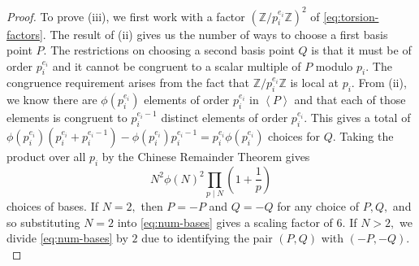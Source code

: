 \documentclass[10pt,a4paper]{amsart}
\begin{document}
\begin{proof}
  To prove (iii), we first work with a factor $(\mathbb{Z}/p_i^{e_i}\mathbb{Z})^2$ of \eqref{eq:torsion-factors}. The result of (ii) gives us the number of ways to choose a first basis point $P$. The restrictions on choosing a second basis point $Q$ is that it must be of order $p_i^{e_i}$ and it cannot be congruent to a scalar multiple of $P$ modulo $p_i.$ The congruence requirement arises from the fact that $\mathbb{Z}/p_i^{e_i} \mathbb{Z}$ is local at $p_i.$ From (ii), we know there are $\phi(p_i^{e_i})$ elements of order $p_i^{e_i}$ in $\left\langle P \right\rangle$ and that each of those elements is congruent to $p_i^{e_i-1}$ distinct elements of order $p_i^{e_i}.$ This gives a total of  $\phi(p_i^{e_i})(p_i^{e_i} + p_i^{e_i-1}) - \phi(p_i^{e_i})p_i^{e_i-1} = p_i^{e_i}\phi(p_i^{e_i})$ choices for $Q.$ Taking the product over all $p_i$ by the Chinese Remainder Theorem gives
  \begin{equation}\label{eq:num-bases}
    N^2\phi(N)^2\prod_{p \mid N}\left( 1 + \frac{1}{p} \right)
  \end{equation}
  choices of bases. If $N = 2,$ then $P = -P$ and $Q = -Q$ for any choice of $P, Q,$ and so substituting $N = 2$ into \eqref{eq:num-bases} gives a scaling factor of $6.$ If $N > 2,$ we divide \eqref{eq:num-bases} by $2$ due to identifying the pair $(P, Q)$ with $(-P, -Q).$
\end{proof}
\end{document}
